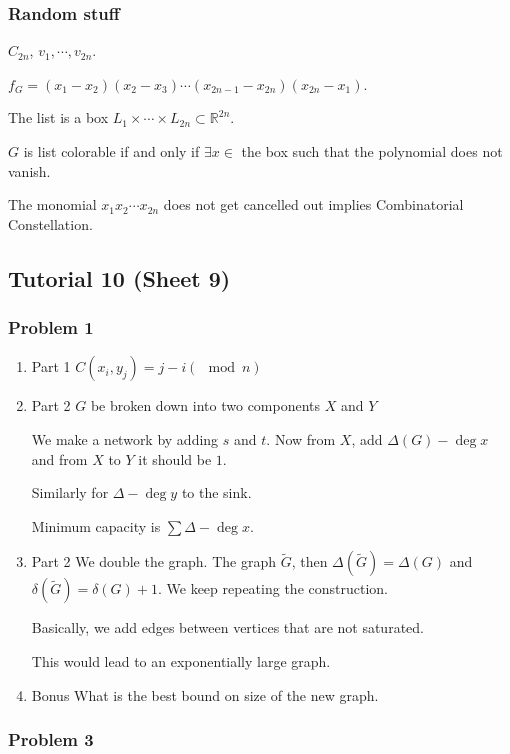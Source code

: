 \documentclass[11pt]{article}
\def\R{\mathbb{R}}
\begin{document}
\subsubsection{Random stuff}
\label{sec:orgec69092}
\(C_{2n}\), \(v_1, \cdots, v_{2n}\).

\(f_G = (x_1 -x_2)(x_2 - x_3) \cdots (x_{2n-1} - x_{2n})(x_{2n} - x_1)\).

The list is a box \(L_1 \times \cdots \times L_{2n} \subset \R^{2n}\).

\(G\) is list colorable if and only if \(\exists x \in\) the box such that the
polynomial does not vanish.

The monomial \(x_1x_2\cdots x_{2n}\) does not get cancelled out implies
Combinatorial Constellation.
\subsection{Tutorial 10 (Sheet 9)}
\label{sec:org625580a}
\subsubsection{Problem 1}
\label{sec:org9657a91}
\begin{enumerate}
\item Part 1
\label{sec:org833a812}
\(C(x_i, y_j) = j - i (\mod n)\)
\item Part 2
\label{sec:org042755f}
\(G\) be broken down into two components \(X\) and \(Y\)

We make a network by adding \(s\) and \(t\). Now from \(X\), add \(\Delta(G) -
     \deg x\) and from \(X\) to \(Y\) it should be \(1\).

Similarly for \(\Delta - \deg y\) to the sink.

Minimum capacity is \(\sum \Delta - \deg x\).
\item Part 2
\label{sec:orgb34b29d}
We double the graph. The graph \(\tilde{G}\), then \(\Delta(\tilde G) =
     \Delta(G)\) and \(\delta(\tilde{G}) = \delta(G) + 1\). We keep repeating the
construction.

Basically, we add edges between vertices that are not saturated.

This would lead to an exponentially large graph.
\item Bonus
\label{sec:orge338bae}
What is the best bound on size of the new graph.
\end{enumerate}
\subsubsection{Problem 3}
\label{sec:orgcdc5e9b}
\end{document}

